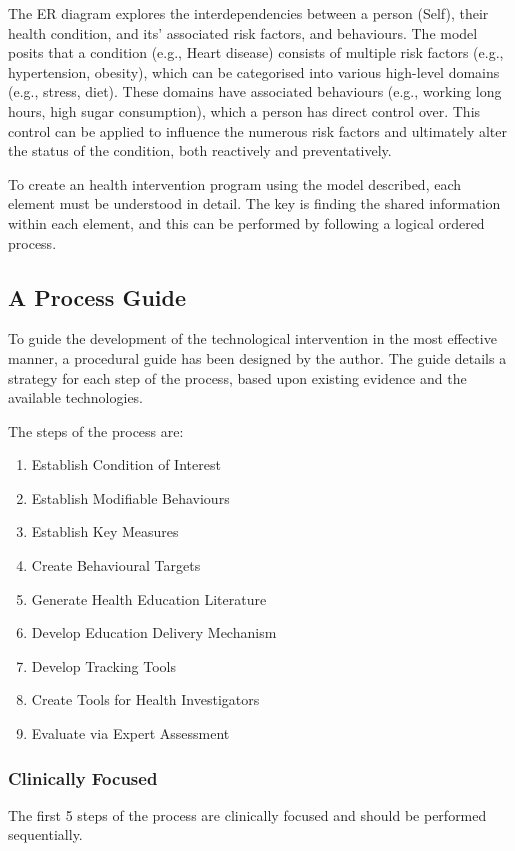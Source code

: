 The ER diagram explores the interdependencies between a person (Self), their health condition, and its' associated risk factors, and behaviours. The model posits that a condition (e.g., Heart disease) consists of multiple risk factors (e.g., hypertension, obesity), which can be categorised into various high-level domains (e.g., stress, diet). These domains have associated behaviours (e.g., working long hours, high sugar consumption), which a person has direct control over. This control can be applied to influence the numerous risk factors and ultimately alter the status of the condition, both reactively and preventatively.

To create an health intervention program using the model described, each element must be understood in detail. The key is finding the shared information within each element, and this can be performed by following a logical ordered process.

\subsection{A Process Guide} \label{subsection: framework-process}
To guide the development of the technological intervention in the most effective manner, a procedural guide has been designed by the author. The guide details a strategy for each step of the process, based upon existing evidence and the available technologies.

The steps of the process are:
\begin{enumerate}[noitemsep,topsep=0pt]
\item Establish Condition of Interest
\item Establish Modifiable Behaviours
\item Establish Key Measures
\item Create Behavioural Targets
\item Generate Health Education Literature
\item Develop Education Delivery Mechanism
\item Develop Tracking Tools
\item Create Tools for Health Investigators
\item Evaluate via Expert Assessment
\end{enumerate}

\subsubsection{Clinically Focused}
The first 5 steps of the process are clinically focused and should be performed sequentially.

